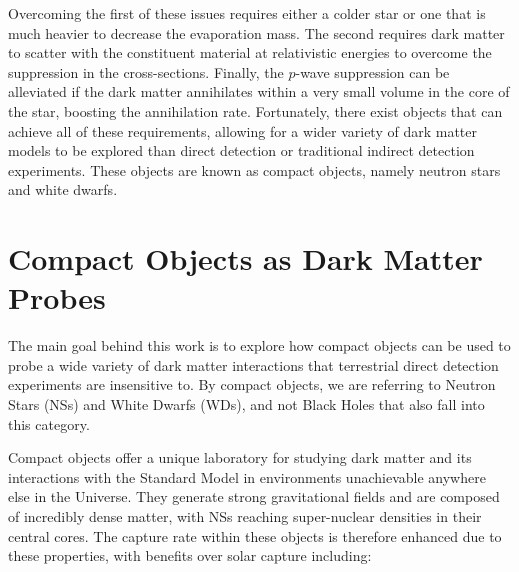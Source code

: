 Overcoming the first of these issues requires either a colder star or one that is much heavier to decrease the evaporation mass. The second requires dark matter to scatter with the constituent material at relativistic energies to overcome the suppression in the cross-sections. Finally, the $p$-wave suppression can be alleviated if the dark matter annihilates within a very small volume in the core of the star, boosting the annihilation rate.
Fortunately, there exist objects that can achieve all of these requirements, allowing for a wider variety of dark matter models to be explored than direct detection or traditional indirect detection experiments. These objects are known as compact objects, namely neutron stars and white dwarfs.

\section{Compact Objects as Dark Matter Probes}

The main goal behind this work is to explore how compact objects can be used to probe a wide variety of dark matter interactions that terrestrial direct detection experiments are insensitive to. By compact objects, we are referring to Neutron Stars (NSs) and White Dwarfs (WDs), and not Black Holes that also fall into this category.


Compact objects offer a unique laboratory for studying dark matter and its interactions with the Standard Model in environments unachievable anywhere else in the Universe. They generate strong gravitational fields and are composed of incredibly dense matter, with NSs reaching super-nuclear densities in their central cores. The capture rate within these objects is therefore enhanced due to these properties, with benefits over solar capture including:


